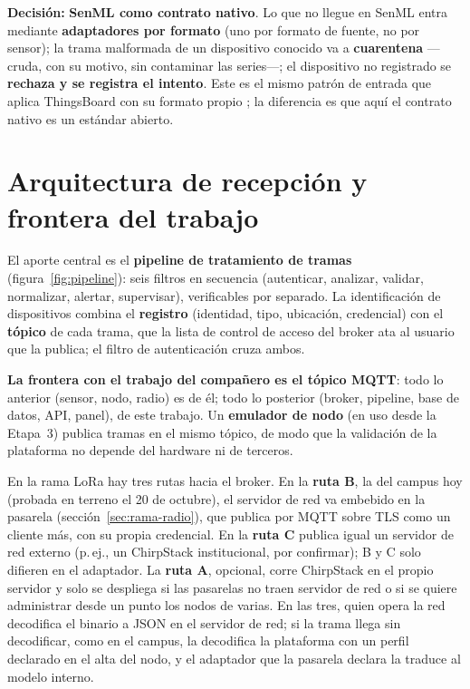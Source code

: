 \textbf{Decisión:} \textbf{SenML como contrato nativo}. Lo que no llegue en SenML entra mediante
\textbf{adaptadores por formato} (uno por formato de fuente, no por sensor); la trama malformada de
un dispositivo conocido va a \textbf{cuarentena} —cruda, con su motivo, sin contaminar las series—;
el dispositivo no registrado se \textbf{rechaza y se registra el intento}. Este es el mismo patrón
de entrada que aplica ThingsBoard con su formato propio \parencite{thingsboardmqtt}; la diferencia
es que aquí el contrato nativo es un estándar abierto.

\section{Arquitectura de recepción y frontera del trabajo}
\label{sec:frontera}

El aporte central es el \textbf{pipeline de tratamiento de tramas} (figura~\ref{fig:pipeline}):
seis filtros en secuencia (autenticar, analizar, validar, normalizar, alertar, supervisar), verificables por separado. La identificación de dispositivos combina
el \textbf{registro} (identidad, tipo, ubicación, credencial) con el \textbf{tópico} de cada trama, que
la lista de control de acceso del broker ata al usuario que la publica; el filtro de autenticación
cruza ambos.



\textbf{La frontera con el trabajo del compañero es el tópico
MQTT}: todo lo anterior (sensor, nodo, radio) es de él; todo lo posterior (broker, pipeline, base de
datos, API, panel), de este trabajo. Un \textbf{emulador de nodo} (en uso desde la Etapa~3) publica tramas en el mismo tópico,
de modo que la validación de la plataforma no depende del hardware ni de terceros.

En la rama LoRa hay tres rutas hacia el broker. En la \textbf{ruta B}, la del campus hoy (probada en terreno el 20 de octubre), el servidor de red va embebido en la pasarela (sección~\ref{sec:rama-radio}), que publica por MQTT sobre TLS como un cliente más, con su propia credencial. En la \textbf{ruta C} publica igual un servidor de red externo (p.\,ej., un ChirpStack institucional, por confirmar); B y C solo difieren en el adaptador. La \textbf{ruta A}, opcional, corre ChirpStack en el propio servidor y solo se despliega si las pasarelas no traen servidor de red o si se quiere administrar desde un punto los nodos de varias. En las tres, quien opera la red decodifica el binario a JSON en el servidor de red; si la trama llega sin decodificar, como en el campus, la decodifica la plataforma con un perfil declarado en el alta del nodo, y el adaptador que la pasarela declara la traduce al modelo interno.


